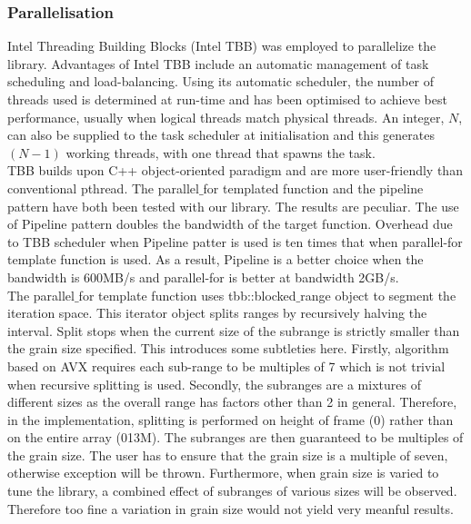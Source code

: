 \documentclass[journal]{IEEEtran}
\begin{document}
\subsubsection{Parallelisation}
Intel Threading Building Blocks (Intel TBB) was employed to parallelize the library. Advantages of Intel TBB include an automatic management of task scheduling and load-balancing. Using its automatic scheduler, the number of threads used is determined at run-time and has been optimised to achieve best performance, usually when logical threads match physical threads. An integer, $N$, can also be supplied to the task scheduler at initialisation and this generates $(N-1)$ working threads, with one thread that spawns the task. \\

TBB builds upon C++ object-oriented paradigm and are more user-friendly than conventional pthread. The parallel$\_$for templated function and the pipeline pattern have both been tested with our library. The results are peculiar. The use of Pipeline pattern doubles the bandwidth of the target function. Overhead due to TBB scheduler when Pipeline patter is used is ten times that when parallel-for template function is used. As a result, Pipeline is a better choice when the bandwidth is \texttildelow 600MB/s and parallel-for is better at bandwidth \texttildelow 2GB/s. \\

The parallel$\_$for template function uses tbb::blocked$\_$range object to segment the iteration space. This iterator object splits ranges by recursively halving the interval. Split stops when the current size of the subrange is strictly smaller than the grain size specified. This introduces some subtleties here. Firstly, algorithm based on AVX requires each sub-range to be multiples of 7 which is not trivial when recursive splitting is used. Secondly, the subranges are a mixtures of different sizes as the overall range has factors other than 2 in general. Therefore, in the implementation, splitting is performed on height of frame (0) rather than on the entire array (0\texttildelow13M). The subranges are then guaranteed to be multiples of the grain size. The user has to ensure that the grain size is a multiple of seven, otherwise exception will be thrown. Furthermore, when grain size is varied to tune the library, a combined effect of subranges of various sizes will be observed. Therefore too fine a variation in grain size would not yield very meanful results.
\end{document}
